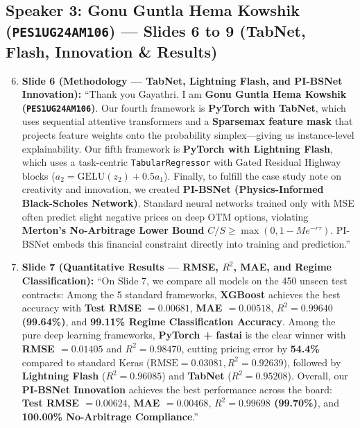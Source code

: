 \documentclass[10pt]{article}
\begin{document}
\subsection*{\color{navy}Speaker 3: Gonu Guntla Hema Kowshik (\texttt{PES1UG24AM106}) --- Slides 6 to 9 (TabNet, Flash, Innovation \& Results)}
\begin{enumerate}
    \setcounter{enumi}{5}
    \item \textbf{Slide 6 (Methodology --- TabNet, Lightning Flash, and PI-BSNet Innovation):}
    ``Thank you Gayathri. I am \textbf{Gonu Guntla Hema Kowshik (\texttt{PES1UG24AM106})}.
    Our fourth framework is \textbf{PyTorch with TabNet}, which uses sequential attentive transformers and a \textbf{Sparsemax feature mask} that projects feature weights onto the probability simplex---giving us instance-level explainability.
    Our fifth framework is \textbf{PyTorch with Lightning Flash}, which uses a task-centric \texttt{TabularRegressor} with Gated Residual Highway blocks ($a_2 = \text{GELU}(z_2) + 0.5 a_1$).
    Finally, to fulfill the case study note on creativity and innovation, we created \textbf{PI-BSNet (Physics-Informed Black-Scholes Network)}. Standard neural networks trained only with MSE often predict slight negative prices on deep OTM options, violating \textbf{Merton's No-Arbitrage Lower Bound} $C/S \ge \max(0, 1 - M e^{-r\tau})$. PI-BSNet embeds this financial constraint directly into training and prediction.''

    \item \textbf{Slide 7 (Quantitative Results --- RMSE, $R^2$, MAE, and Regime Classification):}
    ``On Slide 7, we compare all models on the 450 unseen test contracts:
    Among the 5 standard frameworks, \textbf{XGBoost} achieves the best accuracy with \textbf{Test RMSE $= 0.00681$}, \textbf{MAE $= 0.00518$}, \textbf{$R^2 = 0.99640$ (99.64\%)}, and \textbf{99.11\% Regime Classification Accuracy}.
    Among the pure deep learning frameworks, \textbf{PyTorch + fastai} is the clear winner with \textbf{RMSE $= 0.01405$} and \textbf{$R^2 = 0.98470$}, cutting pricing error by \textbf{54.4\%} compared to standard Keras ($\text{RMSE} = 0.03081, R^2 = 0.92639$), followed by \textbf{Lightning Flash} ($R^2 = 0.96085$) and \textbf{TabNet} ($R^2 = 0.95208$).
    Overall, our \textbf{PI-BSNet Innovation} achieves the best performance across the board: \textbf{Test RMSE $= 0.00624$}, \textbf{MAE $= 0.00468$}, \textbf{$R^2 = 0.99698$ (99.70\%)}, and \textbf{100.00\% No-Arbitrage Compliance}.''


\end{enumerate}
\end{document}
